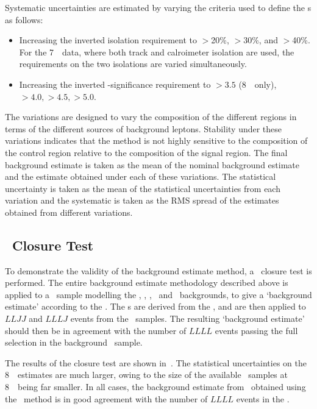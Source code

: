 Systematic uncertainties are estimated by varying the criteria used to define
the \lljet s as follows:
\begin{itemize}
\item Increasing the inverted isolation requirement to $>$20\%, $>$30\%, and
$>$40\%. For the 7~\tev\ data, where both track and calroimeter isolation are
used, the requirements on the two isolations are varied
simultaneously.
\item Increasing the inverted \dzero-significance requirement to
$>3.5$ (8~\tev\ only), $>4.0,>4.5,>5.0$.
\end{itemize}
The variations are designed to vary the composition of the different regions in
terms of the different sources of background leptons. Stability under these
variations indicates that the method is not highly sensitive to the composition
of the control region relative to the composition of the signal region. The
final background estimate is taken as the mean of the nominal background
estimate and the estimate obtained under each of these variations. The
statistical uncertainty is taken as the mean of the statistical uncertainties
from each variation and the systematic is taken as the RMS spread of the
estimates obtained from different variations.

\subsection{\mc\ Closure Test}

To demonstrate the validity of the background estimate method, a \mc\ closure
test is performed. The entire background estimate methodology described above is
applied to a \mc\ sample modelling the \ZX, \ttbar,
\singletop, \WZ\ and \WW\ backgrounds, to give a `background estimate' according
to the \mc. The \ffactor s are derived from the \mc, and are then applied
to $LLJJ$ and $LLLJ$ events from the \mc\ samples. The resulting `background
estimate' should then be in agreement with the number of $LLLL$ events passing the full
selection in the background \mc\ sample.

The results of the closure test are shown in~. The
statistical uncertainties on the 8~\tev\ estimates are much larger, owing to the
size of the available \mc\ samples at 8~\tev\ being far smaller. In all cases, the
background estimate from \mc\ obtained using the \ffactor\ method is in good
agreement with the number of $LLLL$ events in the \mc.

